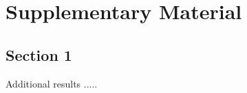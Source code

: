 \appendix
\chapter{Supplementary Material}
\label{appendix}
\section{Section 1}
\begin{paragraph}
Additional results .....
\end{paragraph}
